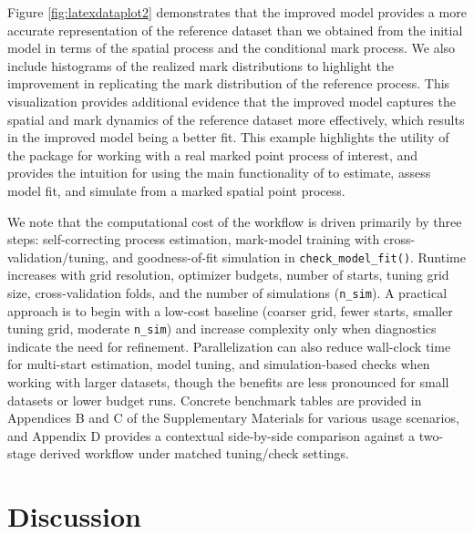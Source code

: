 Figure \ref{fig:latexdataplot2} demonstrates that the improved model
provides a more accurate representation of the reference dataset than we
obtained from the initial model in terms of the spatial process and the
conditional mark process. We also include histograms of the realized
mark distributions to highlight the improvement in replicating the mark
distribution of the reference process. This visualization provides
additional evidence that the improved model captures the spatial and
mark dynamics of the reference dataset more effectively, which results
in the improved model being a better fit. This example highlights the
utility of the package for working with a real marked point process of
interest, and provides the intuition for using the main functionality of
 to estimate, assess model fit, and simulate from a marked
spatial point process.

{We note that the computational cost of the workflow is driven primarily by three steps: self-correcting process estimation, mark-model training with cross-validation/tuning, and goodness-of-fit simulation in \texttt{check\_model\_fit()}. Runtime increases with grid resolution, optimizer budgets, number of starts, tuning grid size, cross-validation folds, and the number of simulations (\texttt{n\_sim}). A practical approach is to begin with a low-cost baseline (coarser grid, fewer starts, smaller tuning grid, moderate \texttt{n\_sim}) and increase complexity only when diagnostics indicate the need for refinement. Parallelization can also reduce wall-clock time for multi-start estimation, model tuning, and simulation-based checks when working with larger datasets, though the benefits are less pronounced for small datasets or lower budget runs. Concrete benchmark tables are provided in Appendices B and C of the Supplementary Materials for various usage scenarios, and Appendix D provides a contextual side-by-side comparison against a two-stage  derived workflow under matched tuning/check settings.}

\section{Discussion}\label{sec:discussion}

